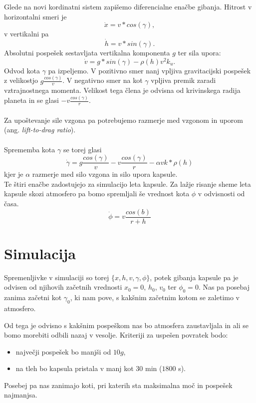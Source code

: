 \documentclass[11pt,a4paper]{article}
\begin{document}
Glede na novi kordinatni sistem zapi\v semo diferencialne ena\v cbe gibanja. Hitrost v horizontalni smeri je
\begin{equation}
	\dot{x} = v * cos(\gamma),
\end{equation}
v vertikalni pa
\begin{equation}
	\dot{h} = v * sin(\gamma).
\end{equation}
Absolutni pospe\v sek sestavljata vertikalna komponenta $g$ ter sila upora:
\begin{equation}
	\dot{v} = g*sin(\gamma) - \rho(h) v^2 k_u.
\end{equation}
Odvod kota $\gamma$ pa izpeljemo. V pozitivno smer nanj vpljiva gravitacijski pospe\v sek z velikostjo $g\frac{cos(\gamma)}{v}$. V negativno smer na kot $\gamma$ vpljiva premik zaradi vztrajnostnega momenta. Velikost tega \v clena je odvisna od krivinskega radija planeta in se glasi $ -v \frac{cos(\gamma)}{r}$.\\ \\
Za upo\v stevanje sile vzgona pa potrebujemo razmerje med vzgonom in uporom (ang. \textit{lift-to-drag ratio}). \\\\
Sprememba kota $\gamma$ se torej glasi
\begin{equation}
	\dot{\gamma} = g\frac{cos(\gamma)}{v}  - v \frac{cos(\gamma)}{r} - \alpha v k*\rho(h)
\end{equation}
kjer je $\alpha$ razmerje med silo vzgona in silo upora kapsule.\\

Te \v stiri ena\v cbe zadostujejo za simulacijo leta kapsule. Za la\v zje risanje sheme  leta kapsule skozi atmosfero pa bomo spremljali \v se vrednost kota $\phi$ v odvisnosti od \v casa.
\begin{equation}
	\dot{\phi} = v \frac{cos(b)}{r+h}
\end{equation}
\newpage

\section{Simulacija}
Spremenljivke v simulaciji so torej $\{x, h, v, \gamma, \phi \}$, potek gibanja kapsule pa je odvisen od njihovih za\v cetnih vrednosti $x_0 = 0$, $h_0$, $v_0$ ter $\phi_0 = 0$. Nas pa posebaj zanima za\v cetni kot $\gamma_0$, ki nam pove, s kak\v snim za\v cetnim kotom se zaletimo v atmosfero.

Od tega je odvisno s kak\v snim pospe\v skom nas bo atmosfera zaustavljala in ali se bomo morebiti odbili nazaj v vesolje. Kriteriji za uspe\v sen povratek bodo:
\begin{itemize}
	\item najve\v cji pospe\v sek bo manj\v si od $10 g$,
	\item na tleh bo kapsula pristala v manj kot $30$ min ($1800$ s).
\end{itemize}
Posebej pa nas zanimajo koti, pri katerih sta maksimalna mo\v c in pospe\v sek najmanjsa. \\
\end{document}

